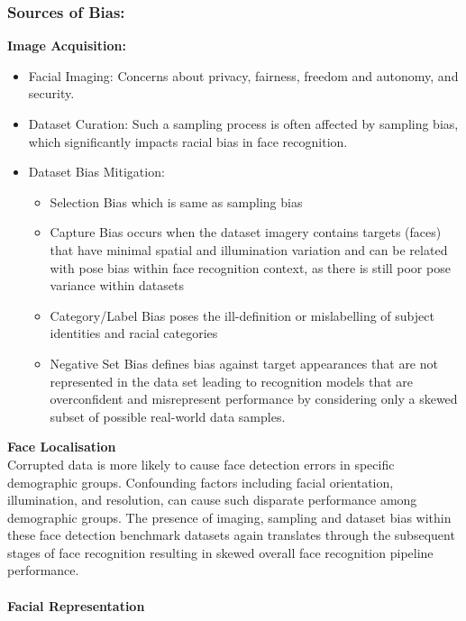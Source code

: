 \documentclass[12pt]{article}
\begin{document}
\subsubsection{Sources of Bias:}
\textbf{Image Acquisition:}
\begin{itemize}
  \item Facial Imaging: Concerns about privacy, fairness, freedom and autonomy, and security.
  \item Dataset Curation: Such a sampling
  process is often affected by sampling bias, which significantly impacts racial bias in face recognition.
  \item Dataset Bias Mitigation:
  \begin{itemize}
    \item Selection Bias which is same as sampling bias
    \item Capture Bias occurs when the
    dataset imagery contains targets (faces) that have minimal spatial and illumination variation and can be related with
    pose bias within face recognition context, as there is still poor pose variance within datasets
    \item Category/Label Bias poses the ill-definition or mislabelling of subject identities and racial categories
    \item Negative Set Bias defines bias against target appearances that are not represented in the data set leading to recognition models that are overconfident and misrepresent performance by considering
    only a skewed subset of possible real-world data samples.
  \end{itemize}
\end{itemize}
\textbf{Face Localisation}\\
Corrupted data is more likely to cause face detection errors in specific demographic groups. Confounding factors including facial orientation, illumination, and resolution, can cause
such disparate performance among demographic groups. The presence of imaging, sampling and dataset bias within these face
detection benchmark datasets again translates through the subsequent stages of face recognition resulting in skewed
overall face recognition pipeline performance.\\
\\
\textbf{Facial Representation}
\end{document}

